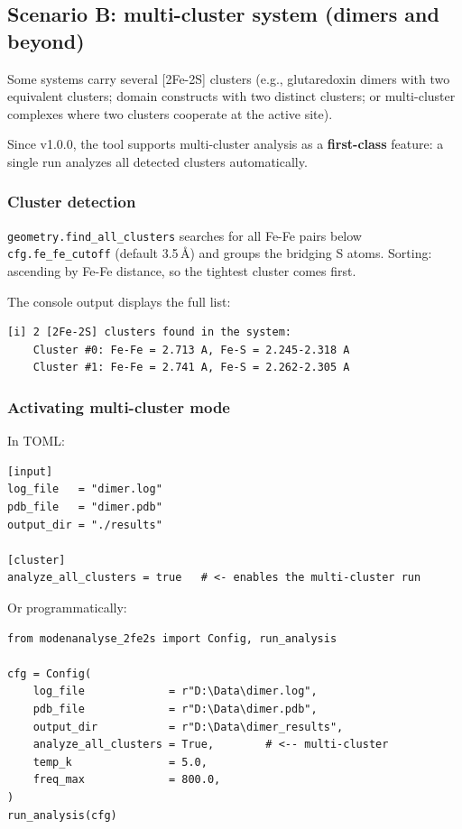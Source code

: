 \documentclass[11pt,a4paper,twoside]{article}
\theoremstyle{remark}
\begin{document}
\subsection{Scenario B: multi-cluster system (dimers and beyond)}
\label{sec:workflow-multi}

Some systems carry several {[}2Fe-2S{]} clusters (e.g.,
glutaredoxin dimers with two equivalent clusters; domain constructs
with two distinct clusters; or multi-cluster complexes where two
clusters cooperate at the active site).

Since v1.0.0, the tool supports multi-cluster analysis as a
\textbf{first-class} feature: a single run analyzes all detected
clusters automatically.

\subsubsection*{Cluster detection}

\texttt{geometry.find\_all\_clusters} searches for all Fe-Fe pairs
below \texttt{cfg.fe\_fe\_cutoff} (default 3.5\,\AA{}) and groups
the bridging S atoms. Sorting: ascending by Fe-Fe distance, so the
tightest cluster comes first.

The console output displays the full list:

\begin{lstlisting}[style=bash]
[i] 2 [2Fe-2S] clusters found in the system:
    Cluster #0: Fe-Fe = 2.713 A, Fe-S = 2.245-2.318 A
    Cluster #1: Fe-Fe = 2.741 A, Fe-S = 2.262-2.305 A
\end{lstlisting}

\subsubsection*{Activating multi-cluster mode}

In TOML:

\begin{lstlisting}[style=python]
[input]
log_file   = "dimer.log"
pdb_file   = "dimer.pdb"
output_dir = "./results"

[cluster]
analyze_all_clusters = true   # <- enables the multi-cluster run
\end{lstlisting}

Or programmatically:

\begin{lstlisting}[style=python]
from modenanalyse_2fe2s import Config, run_analysis

cfg = Config(
    log_file             = r"D:\Data\dimer.log",
    pdb_file             = r"D:\Data\dimer.pdb",
    output_dir           = r"D:\Data\dimer_results",
    analyze_all_clusters = True,        # <-- multi-cluster
    temp_k               = 5.0,
    freq_max             = 800.0,
)
run_analysis(cfg)
\end{lstlisting}
\end{document}
